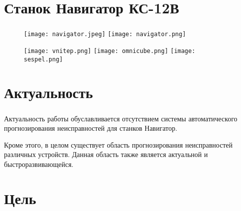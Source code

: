 
\frame[plain]{\titlepage} %


\section{Станок Навигатор КС-12В}

\begin{frame}
\frametitle{\insertsection}


\begin{figure}
    \center
    \texttt{[image: navigator.jpeg]}
    \texttt{[image: navigator.png]}
\end{figure}

\begin{figure}
    \center
    \texttt{[image: vnitep.png]}
    \texttt{[image: omnicube.png]}
    \texttt{[image: sespel.png]}
\end{figure}

\end{frame}


\section{Актуальность}

\begin{frame}
\frametitle{\insertsection}

Актуальность работы обуславливается
отсутствием системы автоматического 
прогнозирования неисправностей для станков Навигатор.

\vspace{\baselineskip}

Кроме этого,
в целом существует область прогнозирования неисправностей
различных устройств. Данная область также является актуальной и быстроразвивающейся.

\end{frame}



\section{Цель}

